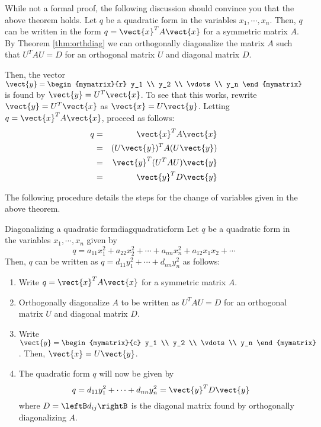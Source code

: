 While not a formal proof, the following discussion should convince you that the above theorem holds. Let $q$ be a quadratic form in the variables $x_1, \cdots, x_n$. Then, $q$ can be written in the form $q = \vect{x}^T A \vect{x}$ for a symmetric matrix $A$.  
By Theorem \ref{thm:orthdiag} we can orthogonally diagonalize the matrix $A$ such that $U^TAU = D$ for an orthogonal matrix $U$ and diagonal matrix $D$. 

Then, the vector $\vect{y} = \begin{mymatrix}{r}
y_1 \\
y_2 \\
\vdots \\
y_n
\end{mymatrix}
$ is found by $\vect{y} = U^T \vect{x}$. To see that this works, rewrite $\vect{y} = U^T \vect{x}$ as $\vect{x} = U\vect{y}$. Letting $q = \vect{x}^TA\vect{x}$, proceed as follows:
\begin{eqnarray*}
q &=& \vect{x}^T A \vect{x}\\
&=& (U\vect{y})^T A (U\vect{y})\\
&=& \vect{y}^T (U^TAU) \vect{y} \\
&=& \vect{y}^T D \vect{y}
\end{eqnarray*}

The following procedure details the steps for the change of variables given in the above theorem. 

\begin{procedure}{Diagonalizing a quadratic form}{diagquadraticform}
Let $q$ be a quadratic form in the variables $x_1, \cdots, x_n$ given by 
\[
q = a_{11}x_1^2 + a_{22}x_2^2 + \cdots + a_{nn}x_n^2 + a_{12}x_1x_2+\cdots
\]
Then, $q$ can be written as $q = d_{11}y_1^2 + \cdots + d_{nn}y_n^2$ as follows:

\begin{enumerate}
\item
Write $q = \vect{x}^T A \vect{x}$ for a symmetric matrix $A$. 

\item
Orthogonally diagonalize $A$ to be written as $U^TAU=D$ for an orthogonal matrix $U$ and diagonal matrix $D$. 

\item
Write $\vect{y} = \begin{mymatrix}{c}
y_1 \\
y_2 \\
\vdots \\
y_n
\end{mymatrix}$. Then, $\vect{x} = U \vect{y}$. 

\item 
The quadratic form $q$ will now be given by 
\[
q = d_{11}y_1^2 + \cdots + d_{nn}y_n^2 = \vect{y}^T D \vect{y}
\]
where $D = \leftB d_{ij} \rightB$ is the diagonal matrix found by orthogonally diagonalizing $A$. 
\end{enumerate}
\end{procedure}

